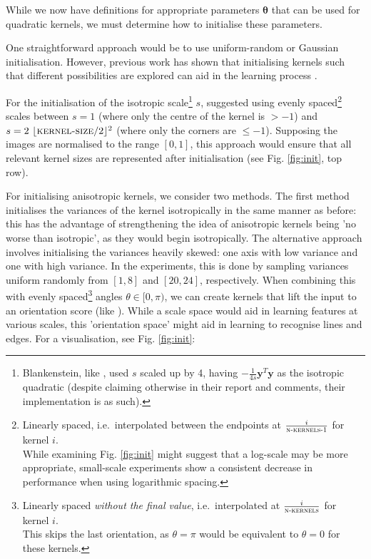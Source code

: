 \documentclass[a4paper, 12pt]{report}
\begin{document}
While we now have definitions for appropriate parameters $\boldsymbol{\theta}$ that can be used for quadratic kernels, we must determine how to initialise these parameters.

One straightforward approach would be to use uniform-random or Gaussian initialisation. However, previous work has shown that initialising kernels such that different possibilities are explored can aid in the learning process \cite{thierrybsc}.

For the initialisation of the isotropic scale\footnote{Blankenstein, like \cite{groenendijk2022morphpool}, used $s$ scaled up by 4, having $-\frac{1}{4s}\mathbf{y}^T\mathbf{y}$ as the isotropic quadratic (despite claiming otherwise in their report and comments, their implementation is as such). } $s$, \cite{thierrybsc} suggested using evenly spaced\footnote{Linearly spaced, i.e.\ interpolated between the endpoints at $\frac{i}{\textsc{n-kernels-1}}$ for kernel $i$.\\While examining Fig. \ref{fig:init} might suggest that a log-scale may be more appropriate, small-scale experiments show a consistent decrease in performance when using logarithmic spacing.  } scales between $s=1$ (where only the centre of the kernel is $>-1$) and $s=2~\lfloor\textsc{kernel-size}/2\rfloor^2$ (where only the corners are $\leq-1$). Supposing the images are normalised to the range $[0, 1]$, this approach would ensure that all relevant kernel sizes are represented after initialisation (see Fig. \ref{fig:init}, top row).

For initialising anisotropic kernels, we consider two methods. The first method initialises the variances of the kernel isotropically in the same manner as before: this has the advantage of strengthening the idea of anisotropic kernels being 'no worse than isotropic', as they would begin isotropically. The alternative approach involves initialising the variances heavily skewed: one axis with low variance and one with high variance. In the experiments, this is done by sampling variances uniform randomly from $[1, 8]$ and $[20, 24]$, respectively. When combining this with evenly spaced\footnote{Linearly spaced \textit{without the final value}, i.e.\ interpolated at $\frac{i}{\textsc{n-kernels}}$ for kernel $i$.
\\
This skips the last orientation, as $\theta=\pi$ would be equivalent to $\theta=0$ for these kernels. \vspace{-0.25cm}
} angles $\theta\in[0, \pi)$, we can create kernels that lift the input to an orientation score (like \cite{smetspde}). While a scale space would aid in learning features at various scales, this 'orientation space' might aid in learning to recognise lines and edges. For a visualisation, see Fig. \ref{fig:init}:
\end{document}
